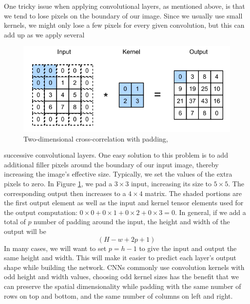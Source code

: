 \documentclass[12pt]{report}
\numberwithin{equation}{section}
\DeclarePairedDelimiter\ceil{\lceil}{\rceil}
\DeclarePairedDelimiter\floor{\lfloor}{\rfloor}
\begin{document}
One tricky issue when applying convolutional layers, as mentioned above, is that we tend to lose pixels on the boundary of our image. Since we usually use small kernels, we might only lose a few pixels for every given convolution, but this can add up as we apply several 
\begin{figure}[H]
\centering
\includegraphics[scale=0.9]{png/padding.png}
\caption[Two-dimensional cross-correlation with padding]{Two-dimensional cross-correlation with padding, {\cite{zhang2020dive}}}
\label{fig:pad}
\end{figure} \noindent
successive convolutional layers. One easy solution to this problem is to add additional filler pixels around the boundary of our input image, thereby increasing the image's effective size. Typically, we set the values of the extra pixels to zero. In Figure \ref{fig:pad}, we pad a $3 \times 3$ input, increasing its size to $5 \times 5$. The corresponding output then increases to a $4 \times 4$ matrix. The shaded portions are the first output element as well as the input and kernel tensor elements used for the output computation: $0 \times 0 + 0 \times 1 + 0 \times 2 + 0 \times 3 = 0$. In general, if we add a total of $p$ number of padding around the input, the height and width of the output will be
\begin{equation} \label{eqn:pad}
\left(H - w + 2p + 1\right)
\end{equation} \noindent
In many cases, we will want to set $p = h - 1$ to give the input and output the same height and width. This will make it easier to predict each layer's output shape while building the network. 
CNNs commonly use convolution kernels with odd height and width values, choosing odd kernel sizes has the benefit that we can preserve the spatial dimensionality while padding with the same number of rows on top and bottom, and the same number of columns on left and right.
\end{document}
